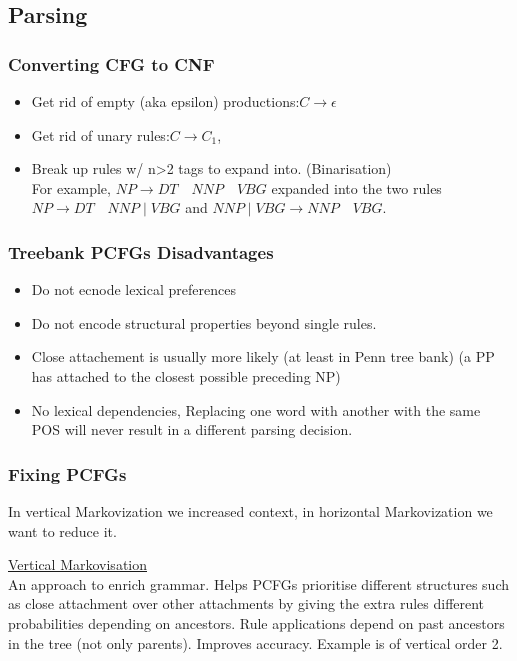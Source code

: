 \documentclass[8pt]{extarticle} %
\begin{document}
\begin{multicols*}{3}
\subsection*{Parsing}
\subsubsection*{Converting CFG to CNF}
\begin{itemize}[label=\textbullet, labelsep=0.3em, leftmargin=0.5em, itemsep=0em]
\item Get rid of empty (aka epsilon) productions:$C\rightarrow \epsilon$
\item Get rid of unary rules:$C\rightarrow C_1$, 
\item Break up rules w/ n>2 tags to expand into. (Binarisation) \\
For example, $NP \rightarrow DT\quad NNP\quad VBG$ expanded into the two rules $NP \rightarrow DT\quad NNP\mid VBG$ and $NNP\mid VBG\rightarrow NNP \quad VBG$. 
\end{itemize}

\subsubsection*{Treebank PCFGs Disadvantages}
\begin{itemize}[label=\textbullet, labelsep=0.3em, leftmargin=0.5em, itemsep=0em]
\item Do not ecnode lexical preferences
\item Do not encode structural properties beyond single rules.
\item Close attachement is usually more likely (at least in Penn tree bank) (a PP has attached to the closest possible preceding NP) 
\item No lexical dependencies, Replacing one word with another with the same POS will never result in a different parsing decision.
\end{itemize}

\subsubsection*{Fixing PCFGs}
In vertical Markovization we increased context, in horizontal Markovization we want to reduce it.

\underline{Vertical Markovisation}\\
An approach to enrich grammar. 
Helps PCFGs prioritise different structures such as close attachment over other attachments by giving the extra rules different probabilities depending on ancestors. 
Rule applications depend on past ancestors in the tree (not only parents). 
Improves accuracy.
Example is of vertical order 2. 


\end{multicols*}
\end{document}
